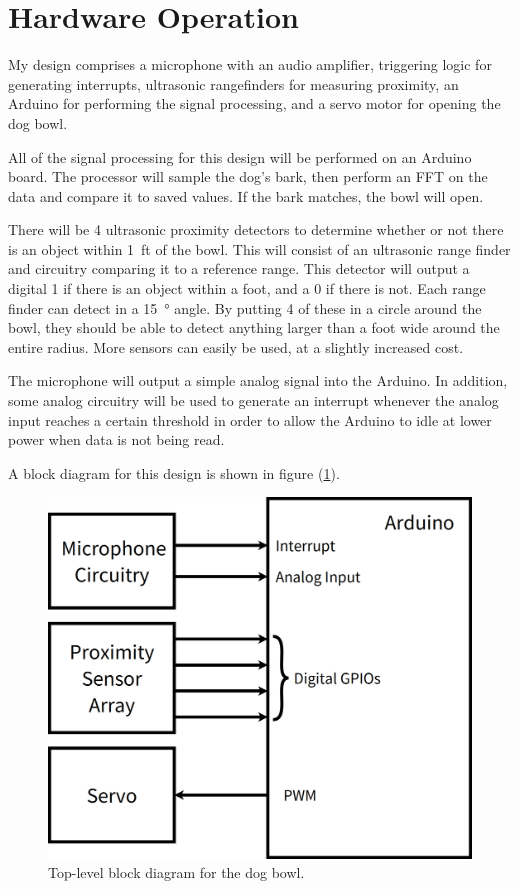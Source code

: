 \documentclass[11pt]{article}           %
\begin{document}
\section{Hardware Operation}
\label{sec:operation}

My design comprises a microphone with an audio amplifier, triggering logic for
generating interrupts, ultrasonic rangefinders for measuring proximity, an
Arduino for performing the signal processing, and a servo motor for opening the
dog bowl.

All of the signal processing for this design will be performed on an Arduino
board. The processor will sample the dog's bark, then perform an FFT on the data
and compare it to saved values. If the bark matches, the bowl will open.

There will be 4 ultrasonic proximity detectors to determine whether or not there
is an object within \SI{1}{ft} of the bowl. This will consist of an ultrasonic
range finder and circuitry comparing it to a reference range. This detector will
output a digital 1 if there is an object within a foot, and a 0 if there is not.
Each range finder can detect in a \SI{15}{\degree} angle. By putting 4 of these
in a circle around the bowl, they should be able to detect anything larger than
a foot wide around the entire radius. More sensors can easily be used, at a
slightly increased cost.

The microphone will output a simple analog signal into the Arduino. In addition,
some analog circuitry will be used to generate an interrupt whenever the analog
input reaches a certain threshold in order to allow the Arduino to idle at lower
power when data is not being read.

A block diagram for this design is shown in figure (\ref{fig:diagram}).

\begin{figure}[h]
    \centering
    \includegraphics[width=0.4\linewidth]{sch/top-level.png}
    \caption{Top-level block diagram for the dog bowl.}
\label{fig:diagram}
\end{figure}
\end{document}
